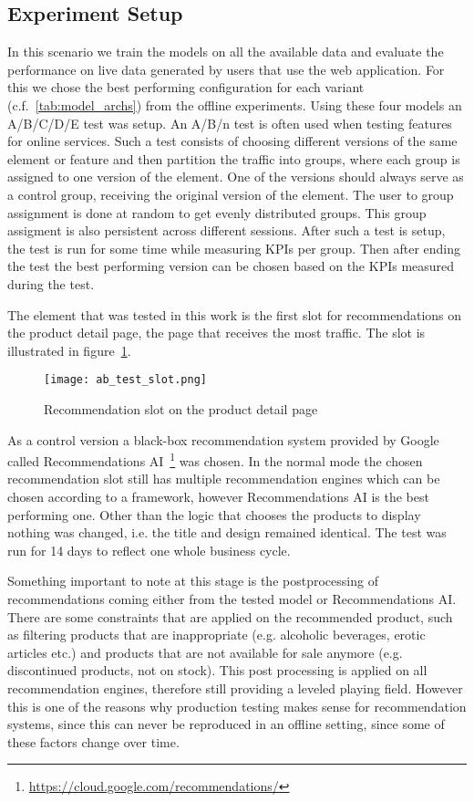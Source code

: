 \subsection{Experiment Setup}
In this scenario we train the models on all the available data and evaluate the performance on live data generated by users that use the web application.
For this we chose the best performing configuration for each variant (c.f.~\ref{tab:model_archs}) from the offline experiments.
Using these four models an A/B/C/D/E test was setup.
An A/B/n test is often used when testing features for online services.
Such a test consists of choosing different versions of the same element or feature and then partition the traffic into groups, where each group is assigned to one version of the element.
One of the versions should always serve as a control group, receiving the original version of the element.
The user to group assignment is done at random to get evenly distributed groups.
This group assigment is also persistent across different sessions.
After such a test is setup, the test is run for some time while measuring KPIs per group.
Then after ending the test the best performing version can be chosen based on the KPIs measured during the test.
\par
The element that was tested in this work is the first slot for recommendations on the product detail page, the page that receives the most traffic.
The slot is illustrated in figure~\ref{fig:ab_test_slot}.
\begin{figure}[t]
	\centering
	\captionsetup{width=0.8\textwidth}
    \texttt{[image: ab\_test\_slot.png]}
    \caption{Recommendation slot on the product detail page}
    \label{fig:ab_test_slot}
\end{figure}
As a control version a black-box recommendation system provided by Google called Recommendations AI~\footnote{\url{https://cloud.google.com/recommendations/}} was chosen.
In the normal mode the chosen recommendation slot still has multiple recommendation engines which can be chosen according to a framework, however Recommendations AI is the best performing one.
Other than the logic that chooses the products to display nothing was changed, i.e. the title and design remained identical.
The test was run for 14 days to reflect one whole business cycle.
\par
Something important to note at this stage is the postprocessing of recommendations coming either from the tested model or Recommendations AI.
There are some constraints that are applied on the recommended product, such as filtering products that are inappropriate (e.g. alcoholic beverages, erotic articles etc.) and products that are not available for sale anymore (e.g. discontinued products, not on stock).
This post processing is applied on all recommendation engines, therefore still providing a leveled playing field.
However this is one of the reasons why production testing makes sense for recommendation systems, since this can never be reproduced in an offline setting, since some of these factors change over time.
